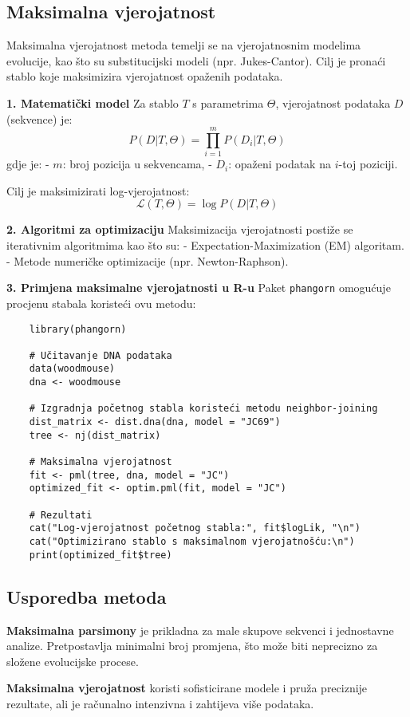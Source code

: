 \documentclass[10pt,a4paper,twoside]{article}
\begin{document}
\subsection*{Maksimalna vjerojatnost}

Maksimalna vjerojatnost metoda temelji se na vjerojatnosnim modelima evolucije, kao što su substitucijski modeli (npr. Jukes-Cantor). Cilj je pronaći stablo koje maksimizira vjerojatnost opaženih podataka.

\textbf{1. Matematički model}  
Za stablo \( T \) s parametrima \( \Theta \), vjerojatnost podataka \( D \) (sekvence) je:
\[
P(D | T, \Theta) = \prod_{i=1}^m P(D_i | T, \Theta)
\]
gdje je:
- \( m \): broj pozicija u sekvencama,
- \( D_i \): opaženi podatak na \( i \)-toj poziciji.

Cilj je maksimizirati log-vjerojatnost:
\[
\mathcal{L}(T, \Theta) = \log P(D | T, \Theta)
\]

\textbf{2. Algoritmi za optimizaciju}  
Maksimizacija vjerojatnosti postiže se iterativnim algoritmima kao što su:
- Expectation-Maximization (EM) algoritam.
- Metode numeričke optimizacije (npr. Newton-Raphson).

\textbf{3. Primjena maksimalne vjerojatnosti u R-u}  
Paket \texttt{phangorn} omogućuje procjenu stabala koristeći ovu metodu:
\begin{verbatim}
	library(phangorn)
	
	# Učitavanje DNA podataka
	data(woodmouse)
	dna <- woodmouse
	
	# Izgradnja početnog stabla koristeći metodu neighbor-joining
	dist_matrix <- dist.dna(dna, model = "JC69")
	tree <- nj(dist_matrix)
	
	# Maksimalna vjerojatnost
	fit <- pml(tree, dna, model = "JC")
	optimized_fit <- optim.pml(fit, model = "JC")
	
	# Rezultati
	cat("Log-vjerojatnost početnog stabla:", fit$logLik, "\n")
	cat("Optimizirano stablo s maksimalnom vjerojatnošću:\n")
	print(optimized_fit$tree)
\end{verbatim}

\subsection*{Usporedba metoda}

\textbf{Maksimalna parsimony} je prikladna za male skupove sekvenci i jednostavne analize. Pretpostavlja minimalni broj promjena, što može biti neprecizno za složene evolucijske procese.

\textbf{Maksimalna vjerojatnost} koristi sofisticirane modele i pruža preciznije rezultate, ali je računalno intenzivna i zahtijeva više podataka.
\end{document}
